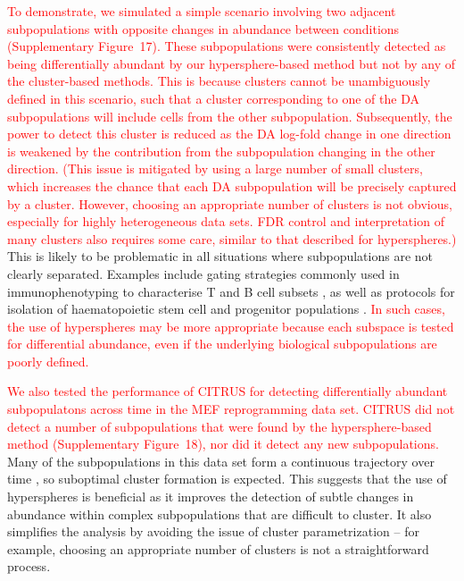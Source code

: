 \documentclass{article}
\newcommand\revised[1]{\textcolor{red}{#1}}
\newcommand{\suppfigclustersim}{17}
\newcommand{\suppfigclusterreal}{18}
\begin{document}
\revised{To demonstrate, we simulated a simple scenario involving two adjacent subpopulations with opposite changes in abundance between conditions (Supplementary Figure~\suppfigclustersim{}).
These subpopulations were consistently detected as being differentially abundant by our hypersphere-based method but not by any of the cluster-based methods.
This is because clusters cannot be unambiguously defined in this scenario, such that a cluster corresponding to one of the DA subpopulations will include cells from the other subpopulation.
Subsequently, the power to detect this cluster is reduced as the DA log-fold change in one direction is weakened by the contribution from the subpopulation changing in the other direction.
(This issue is mitigated by using a large number of small clusters, which increases the chance that each DA subpopulation will be precisely captured by a cluster.
However, choosing an appropriate number of clusters is not obvious, especially for highly heterogeneous data sets.
FDR control and interpretation of many clusters also requires some care, similar to that described for hyperspheres.)}
This is likely to be problematic in all situations where subpopulations are not clearly separated.
Examples include gating strategies commonly used in immunophenotyping to characterise T and B cell subsets \cite{finak2016standardizing}, as well as protocols for isolation of haematopoietic stem cell and progenitor populations \cite{wilson2015combined}.
\revised{In such cases, the use of hyperspheres may be more appropriate because each subspace is tested for differential abundance, even if the underlying biological subpopulations are poorly defined.}

\revised{We also tested the performance of CITRUS for detecting differentially abundant subpopulatons across time in the MEF reprogramming data set.
CITRUS did not detect a number of subpopulations that were found by the hypersphere-based method (Supplementary Figure~\suppfigclusterreal{}), nor did it detect any new subpopulations.}
Many of the subpopulations in this data set form a continuous trajectory over time \cite{zunder2015continuous}, so suboptimal cluster formation is expected.
This suggests that the use of hyperspheres is beneficial as it improves the detection of subtle changes in abundance within complex subpopulations that are difficult to cluster.
It also simplifies the analysis by avoiding the issue of cluster parametrization -- for example, choosing an appropriate number of clusters is not a straightforward process.
\end{document}
